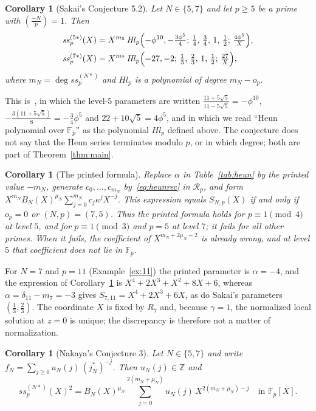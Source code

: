\documentclass[11pt,a4paper]{article}
\newtheorem{corollary}[theorem]{Corollary}
\theoremstyle{definition}
\theoremstyle{remark}
\newcommand{\F}{\mathbb{F}}
\newcommand{\Z}{\mathbb{Z}}
\newcommand{\leg}[2]{\left(\frac{#1}{#2}\right)}
\newcommand{\Hl}{\mathit{Hl}}
\newcommand{\ssp}{\mathit{ss}_p}
\numberwithin{equation}{section}
\begin{document}
\begin{corollary}[Sakai's Conjecture 5.2]\label{cor:sakai}
Let $N\in\{5,7\}$ and let $p\ge5$ be a prime with $\leg{-N}{p}=1$. Then
\begin{align*}
\ssp^{(5*)}(X)&=X^{m_5}\,\Hl_p\Bigl(-\phi^{10},-\tfrac{3\phi^5}{4};\,
\tfrac14,\,\tfrac34,\,1,\,\tfrac12;\,\tfrac{4\phi^5}{X}\Bigr),\\
\ssp^{(7*)}(X)&=X^{m_7}\,\Hl_p\Bigl(-27,-2;\,
\tfrac13,\,\tfrac23,\,1,\,\tfrac12;\,\tfrac{27}{X}\Bigr),
\end{align*}
where $m_N=\deg\ssp^{(N*)}$ and $\Hl_p$ is a polynomial of degree $m_N-o_p$.
\end{corollary}

This is~\cite[Conjecture~5.2]{Sakai14}, in which the level-$5$ parameters are
written $\frac{11+5\sqrt5}{11-5\sqrt5}=-\phi^{10}$,
$-\frac{3(11+5\sqrt5)}{8}=-\frac34\phi^5$ and $22+10\sqrt5=4\phi^5$, and in
which we read ``Heun polynomial over $\F_p$'' as the polynomial $\Hl_p$
defined above. The conjecture does not say that the Heun series terminates
modulo $p$, or in which degree; both are part of Theorem~\ref{thm:main}.

\begin{corollary}[The printed formula]\label{cor:printed}
Replace $\alpha$ in Table~\ref{tab:heun} by the printed value $-m_N$, generate
$c_0,\dots,c_{m_N}$ by~\eqref{eq:heunrec} in $\mathcal R_p$, and form
$X^{m_N}B_N(X)^{\mu_N}\sum_{j=0}^{m_N}c_j\kappa^jX^{-j}$. This expression
equals $S_{N,p}(X)$ if and only if $o_p=0$ or $(N,p)=(7,5)$. Thus the printed
formula holds for $p\equiv1\pmod4$ at level $5$, and for $p\equiv1\pmod3$ and
$p=5$ at level $7$; it fails for all other primes. When it fails, the
coefficient of $X^{m_N+2\mu_N-2}$ is already wrong, and at level $5$ that
coefficient does not lie in $\F_p$.
\end{corollary}

For $N=7$ and $p=11$ (Example~\ref{ex:11}) the printed parameter is
$\alpha=-4$, and the expression of Corollary~\ref{cor:printed} is
$X^4+2X^3+X^2+8X+6$, whereas $\alpha=\delta_{11}-m_7=-3$ gives
$S_{7,11}=X^4+2X^3+6X$, as do Sakai's parameters $(\frac13,\frac23)$. The
coordinate $X$ is fixed by $R_7$ and, because
$\gamma=1$, the normalized local solution at $z=0$ is unique; the discrepancy
is therefore not a matter of normalization.

\begin{corollary}[Nakaya's Conjecture 3]\label{cor:conj3}
Let $N\in\{5,7\}$ and write $f_N=\sum_{j\ge0}u_N(j)\,(j_N^*)^{-j}$. Then
$u_N(j)\in\Z$ and
\begin{equation}\label{eq:conj3}
 \ssp^{(N*)}(X)^2=B_N(X)^{\mu_N}
 \sum_{j=0}^{2(m_N+\mu_N)}u_N(j)\,X^{2(m_N+\mu_N)-j}
 \quad\text{in }\F_p[X].
\end{equation}
\end{corollary}
\end{document}
